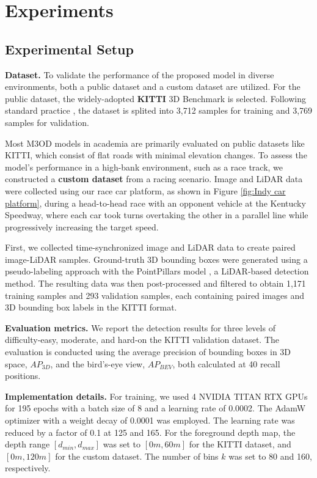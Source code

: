 \section{Experiments}
\label{sec:experiment}
\subsection{Experimental Setup}
\textbf{Dataset.} To validate the performance of the proposed model in diverse environments, both a public dataset and a custom dataset are utilized. For the public dataset, the widely-adopted \textbf{KITTI} 3D Benchmark \cite{geiger2012we} is selected. Following standard practice \cite{chen20153d, chen2016monocular}, the dataset is splited into 3,712 samples for training and 3,769 samples for validation.

Most M3OD models in academia are primarily evaluated on public datasets like KITTI, which consist of flat roads with minimal elevation changes. To assess the model's performance in a high-bank environment, such as a race track, we constructed a \textbf{custom dataset} from a racing scenario. Image and LiDAR data were collected using our race car platform, as shown in Figure \ref{fig:Indy car platform}, during a head-to-head race with an opponent vehicle at the Kentucky Speedway, where each car took turns overtaking the other in a parallel line while progressively increasing the target speed.

First, we collected time-synchronized image and LiDAR data to create paired image-LiDAR samples. Ground-truth 3D bounding boxes were generated using a pseudo-labeling approach with the PointPillars model \cite{lang2019pointpillars}, a LiDAR-based detection method. The resulting data was then post-processed and filtered to obtain 1,171 training samples and 293 validation samples, each containing paired images and 3D bounding box labels in the KITTI format.

\textbf{Evaluation metrics.}  We report the detection results for three levels of difficulty-easy, moderate, and hard-on the KITTI validation dataset.
The evaluation is conducted using the average precision of bounding boxes in 3D space, $AP_{3D}$, and the bird's-eye view, $AP_{BEV}$, both calculated at 40 recall positions.

\textbf{Implementation details.} For training, we used 4 NVIDIA TITAN RTX GPUs for 195 epochs with a batch size of 8 and a learning rate of 0.0002. The AdamW \cite{loshchilov2017decoupled} optimizer with a weight decay of 0.0001 was employed. The learning rate was reduced by a factor of 0.1 at 125 and 165. For the foreground depth map, the depth range $[d_{min}, d_{max}]$ was set to $[0m, 60m]$ for the KITTI dataset, and $[0m, 120m]$ for the custom dataset. The number of bins $k$ was set to 80 and 160, respectively.

